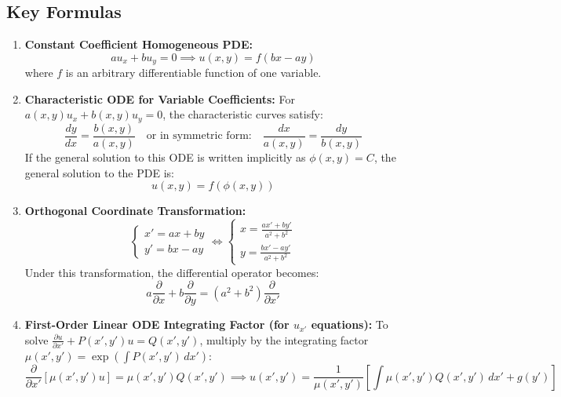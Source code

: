 \documentclass[11pt]{article}
\begin{document}
\subsection{Key Formulas}
\begin{enumerate}
    \item \textbf{Constant Coefficient Homogeneous PDE:}
    \[
    au_x + bu_y = 0 \implies u(x, y) = f(bx - ay)
    \]
    where $f$ is an arbitrary differentiable function of one variable.
    
    \item \textbf{Characteristic ODE for Variable Coefficients:}
    For $a(x, y)u_x + b(x, y)u_y = 0$, the characteristic curves satisfy:
    \[
    \frac{dy}{dx} = \frac{b(x, y)}{a(x, y)} \quad \text{or in symmetric form:} \quad \frac{dx}{a(x, y)} = \frac{dy}{b(x, y)}
    \]
    If the general solution to this ODE is written implicitly as $\phi(x, y) = C$, the general solution to the PDE is:
    \[
    u(x, y) = f(\phi(x, y))
    \]
    
    \item \textbf{Orthogonal Coordinate Transformation:}
    \[
    \begin{cases} x' = ax + by \\ y' = bx - ay \end{cases} \iff \begin{cases} x = \frac{ax' + by'}{a^2 + b^2} \\ y = \frac{bx' - ay'}{a^2 + b^2} \end{cases}
    \]
    Under this transformation, the differential operator becomes:
    \[
    a\frac{\partial}{\partial x} + b\frac{\partial}{\partial y} = (a^2 + b^2)\frac{\partial}{\partial x'}
    \]
    
    \item \textbf{First-Order Linear ODE Integrating Factor (for $u_{x'}$ equations):}
    To solve $\frac{\partial u}{\partial x'} + P(x', y')u = Q(x', y')$, multiply by the integrating factor $\mu(x', y') = \exp\left(\int P(x', y')\,dx'\right)$:
    \[
    \frac{\partial}{\partial x'}\left[\mu(x', y') u\right] = \mu(x', y')Q(x', y') \implies u(x', y') = \frac{1}{\mu(x', y')}\left[\int \mu(x', y')Q(x', y')\,dx' + g(y')\right]
    \]
\end{enumerate}
\end{document}
